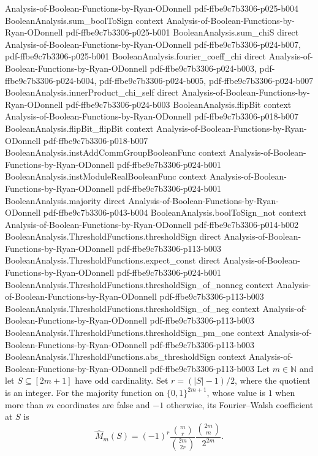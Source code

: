 \begin{theorem}
  {Analysis-of-Boolean-Functions-by-Ryan-ODonnell}
  {pdf-ffbe9c7b3306-p025-b004}
\proofstep
  {BooleanAnalysis.sum_boolToSign}
  {context}
  {Analysis-of-Boolean-Functions-by-Ryan-ODonnell}
  {pdf-ffbe9c7b3306-p025-b001}
\proofstep
  {BooleanAnalysis.sum_chiS}
  {direct}
  {Analysis-of-Boolean-Functions-by-Ryan-ODonnell}
  {pdf-ffbe9c7b3306-p024-b007,
    pdf-ffbe9c7b3306-p025-b001}
\proofstep
  {BooleanAnalysis.fourier_coeff_chi}
  {direct}
  {Analysis-of-Boolean-Functions-by-Ryan-ODonnell}
  {pdf-ffbe9c7b3306-p024-b003,
    pdf-ffbe9c7b3306-p024-b004,
    pdf-ffbe9c7b3306-p024-b005,
    pdf-ffbe9c7b3306-p024-b007}
\proofstep
  {BooleanAnalysis.innerProduct_chi_self}
  {direct}
  {Analysis-of-Boolean-Functions-by-Ryan-ODonnell}
  {pdf-ffbe9c7b3306-p024-b003}
\proofstep
  {BooleanAnalysis.flipBit}
  {context}
  {Analysis-of-Boolean-Functions-by-Ryan-ODonnell}
  {pdf-ffbe9c7b3306-p018-b007}
\proofstep
  {BooleanAnalysis.flipBit_flipBit}
  {context}
  {Analysis-of-Boolean-Functions-by-Ryan-ODonnell}
  {pdf-ffbe9c7b3306-p018-b007}
\proofstep
  {BooleanAnalysis.instAddCommGroupBooleanFunc}
  {context}
  {Analysis-of-Boolean-Functions-by-Ryan-ODonnell}
  {pdf-ffbe9c7b3306-p024-b001}
\proofstep
  {BooleanAnalysis.instModuleRealBooleanFunc}
  {context}
  {Analysis-of-Boolean-Functions-by-Ryan-ODonnell}
  {pdf-ffbe9c7b3306-p024-b001}
\proofstep
  {BooleanAnalysis.majority}
  {direct}
  {Analysis-of-Boolean-Functions-by-Ryan-ODonnell}
  {pdf-ffbe9c7b3306-p043-b004}
\proofstep
  {BooleanAnalysis.boolToSign_not}
  {context}
  {Analysis-of-Boolean-Functions-by-Ryan-ODonnell}
  {pdf-ffbe9c7b3306-p014-b002}
\proofstep
  {BooleanAnalysis.ThresholdFunctions.thresholdSign}
  {direct}
  {Analysis-of-Boolean-Functions-by-Ryan-ODonnell}
  {pdf-ffbe9c7b3306-p113-b003}
\proofstep
  {BooleanAnalysis.ThresholdFunctions.expect_const}
  {direct}
  {Analysis-of-Boolean-Functions-by-Ryan-ODonnell}
  {pdf-ffbe9c7b3306-p024-b001}
\proofstep
  {BooleanAnalysis.ThresholdFunctions.thresholdSign_of_nonneg}
  {context}
  {Analysis-of-Boolean-Functions-by-Ryan-ODonnell}
  {pdf-ffbe9c7b3306-p113-b003}
\proofstep
  {BooleanAnalysis.ThresholdFunctions.thresholdSign_of_neg}
  {context}
  {Analysis-of-Boolean-Functions-by-Ryan-ODonnell}
  {pdf-ffbe9c7b3306-p113-b003}
\proofstep
  {BooleanAnalysis.ThresholdFunctions.thresholdSign_pm_one}
  {context}
  {Analysis-of-Boolean-Functions-by-Ryan-ODonnell}
  {pdf-ffbe9c7b3306-p113-b003}
\proofstep
  {BooleanAnalysis.ThresholdFunctions.abs_thresholdSign}
  {context}
  {Analysis-of-Boolean-Functions-by-Ryan-ODonnell}
  {pdf-ffbe9c7b3306-p113-b003}
Let $m\in\mathbb N$ and let $S\subseteq[2m+1]$ have odd cardinality. Set $r=(|S|-1)/2$,
where the quotient is an integer. For the majority function on $\{0,1\}^{2m+1}$, whose
value is $1$ when more than $m$ coordinates are false and $-1$ otherwise, its
Fourier--Walsh coefficient at $S$ is
\[\widehat M_m(S)=(-1)^r\frac{\binom{m}{r}}{\binom{2m}{2r}}\frac{\binom{2m}{m}}{2^{2m}}.\]
\end{theorem}

